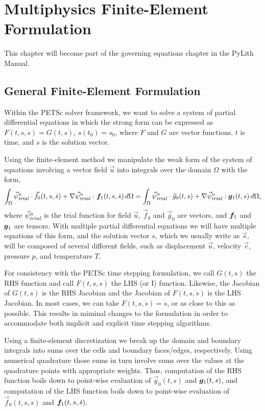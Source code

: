 \chapter{Multiphysics Finite-Element Formulation}
\label{cha:multiphysics:formulation}

This chapter will become part of the governing equations chapter in
the PyLith Manual.

\section{General Finite-Element Formulation}

Within the PETSc solver framework, we want to solve a system of
partial differential equations in which the strong form can be
expressed as $F(t,s,\dot{s}) = G(t,s)$, $s(t_0) = s_0$, where $F$ and
$G$ are vector functions, $t$ is time, and $s$ is the solution vector.

Using the finite-element method we manipulate the weak form of the
system of equations involving a vector field $\vec{u}$ into integrals
over the domain $\Omega$ with the form,
\begin{equation}
  \label{eqn:problem:form}
  \int_\Omega \trialvec[u] \cdot \vec{f}_0(t,s,\dot{s}) + \nabla \trialvec[u] : \tensor{f}
_1(t,s,\dot{s}) \, 
d\Omega =
  \int_\Omega \trialvec[u] \cdot \vec{g}_0(t,s) + \nabla \trialvec[u] : \tensor{g}_1(t,s) \, 
d\Omega,
\end{equation}
where $\trialvec[u]$ is the trial function for field $\vec{u}$,
$\vec{f}_0$ and $\vec{g}_0$ are vectors, and $\tensor{f}_1$ and
$\tensor{g}_1$ are tensors. With multiple partial differential
equations we will have multiple equations of this form, and the
solution vector $s$, which we usually write as $\vec{s}$, will be
composed of several different fields, such as displacement $\vec{u}$,
velocity $\vec{v}$, pressure $p$, and temperature $T$.

For consistency with the PETSc time stepping formulation, we call
$G(t,s)$ the RHS function and call $F(t,s,\dot{s})$ the LHS (or I)
function. Likewise, the Jacobian of $G(t,s)$ is the RHS Jacobian and
the Jacobian of $F(t,s,\dot{s})$ is the LHS Jacobian. In most cases,
we can take $F(t,s,\dot{s}) = \dot{s}$, or as close to this as
possible. This results in miminal changes to the formulation in order
to accommodate both implicit and explicit time stepping algorithms.

Using a finite-element discretization we break up the domain and
boundary integrals into sums over the cells and boundary faces/edges,
respectively. Using numerical quadrature those sums in turn involve
sums over the values at the quadrature points with appropriate
weights. Thus, computation of the RHS function boils down to
point-wise evaluation of $\vec{g}_0(t,s)$ and $\tensor{g}_1(t,s)$, and
computation of the LHS function boils down to point-wise evaluation of
$\vec{f}_0(t,s,\dot{s})$ and $\tensor{f}_1(t,s,\dot{s})$.

